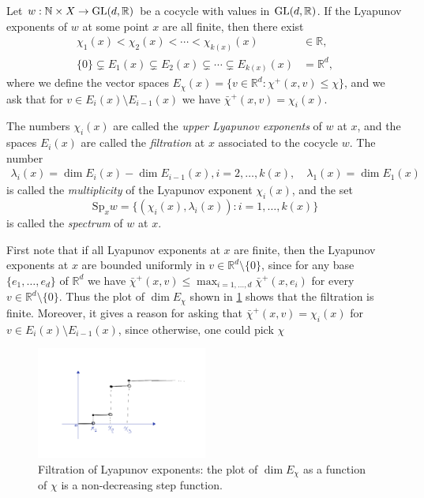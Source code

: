\documentclass{report}
\begin{document}
\begin{definition}
    Let $w: \mathbb N \times X \to \operatorname{{\mathrm{GL}}}(d, \mathbb R)$ be a cocycle with values in $\operatorname{{\mathrm{GL}}}(d,\mathbb R)$.
    If the Lyapunov exponents of $w$ at some point $x$ are all finite, then there exist
    \begin{align*}
        \chi_1(x) < \chi_2(x) < \cdots < \chi_{k(x)}(x) &\in \mathbb R,\\
        \{0 \} \subsetneq E_1(x) \subsetneq E_2(x) \subsetneq \cdots \subsetneq E_{k(x)}(x) &= \mathbb R^d,
    \end{align*}
    where we define the vector spaces $E_\chi(x) = \{v \in \mathbb R^d: \chi^+(x,v) \leq \chi\}$, and we ask that for $v \in E_i(x) \setminus E_{i-1}(x)$ we have $\bar \chi^+(x,v) = \chi_i(x)$.

    The numbers $\chi_i(x)$ are called the \emph{upper Lyapunov exponents} of $w$ at $x$, and the spaces $E_i(x)$ are called the \emph{filtration} at $x$ associated to the cocycle $w$.
    The number 
    \begin{align*}
        \lambda_i(x) = \dim E_i(x) - \dim E_{i-1}(x), i = 2, \ldots, k(x), \quad \lambda_1(x) = \dim E_1(x)
    \end{align*}
    is called the \emph{multiplicity} of the Lyapunov exponent $\chi_i(x)$, and the set
    \[
    \mathrm{Sp}_x w = \{(\chi_i(x), \lambda_i(x)): i = 1, \ldots, k(x)\}
    \]
    is called the \emph{spectrum} of $w$ at $x$.
\end{definition}

\begin{remark}
    First note that if all Lyapunov exponents at $x$ are finite, then the Lyapunov exponents at $x$ are bounded uniformly in $v \in \mathbb R^d \setminus \{0\}$, since for any base $\{e_1, \ldots, e_d\}$ of $\mathbb R^d$ we have $\bar \chi^+(x, v) \leq \max_{i=1,\ldots,d} \bar \chi^+(x, e_i)$ for every $v \in \mathbb R^d \setminus \{0\}$.
    Thus the plot of $\dim E_\chi$ shown in \cref{fig:lyapunov_filtration} shows that the filtration is finite.
    Moreover, it gives a reason for asking that $\bar \chi^+(x,v) = \chi_i(x)$ for $v \in E_i(x) \setminus E_{i-1}(x)$, since otherwise, one could pick $\chi$ 
\end{remark}
\begin{figure}[h]
        \centering
        \includegraphics[width=0.5\textwidth]{figures/exponents.png}
        \caption{Filtration of Lyapunov exponents: the plot of $\dim E_\chi$ as a function of $\chi$ is a non-decreasing step function.}
        \label{fig:lyapunov_filtration}
    \end{figure}
\end{document}
